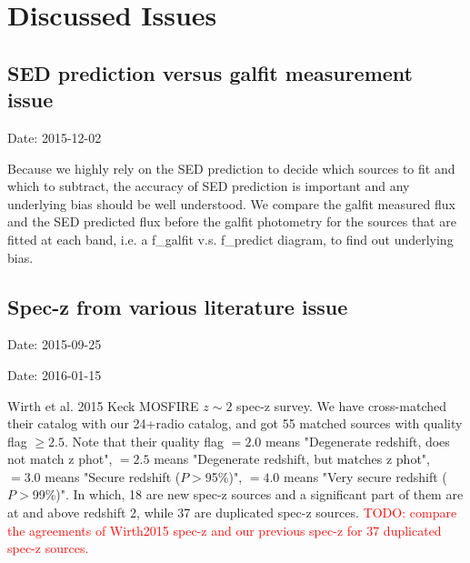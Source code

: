 \documentclass[11pt,a4paper]{article}
\begin{document}

\clearpage

\section{Discussed Issues}
\label{Appendix_DiscussedIssues}

\subsection{SED prediction versus galfit measurement issue}

\textcolor{green!90!black!60!orange}{Date: 2015-12-02}

Because we highly rely on the SED prediction to decide which sources to fit and which to subtract, the accuracy of SED prediction is important and any underlying bias should be well understood. We compare the galfit measured flux and the SED predicted flux before the galfit photometry for the sources that are fitted at each band, i.e. a f\_galfit v.s. f\_predict diagram, to find out underlying bias. 


\subsection{Spec-z from various literature issue}

\textcolor{green!90!black!60!orange}{Date: 2015-09-25}

\textcolor{green!90!black!60!orange}{Date: 2016-01-15}

Wirth et al. 2015 Keck MOSFIRE $z\sim2$ spec-z survey. We have cross-matched their catalog with our 24+radio catalog, and got 55 matched sources with quality flag $\ge2.5$. Note that their quality flag $=2.0$ means "Degenerate redshift, does not match z phot", $=2.5$ means "Degenerate redshift, but matches z phot", $=3.0$ means "Secure redshift ($P>$95\%)", $=4.0$ means "Very secure redshift ($P>$99\%)". In which, 18 are new spec-z sources and a significant part of them are at and above redshift 2, while 37 are duplicated spec-z sources. \textcolor{red}{TODO: compare the agreements of Wirth2015 spec-z and our previous spec-z for 37 duplicated spec-z sources.}
\end{document}
